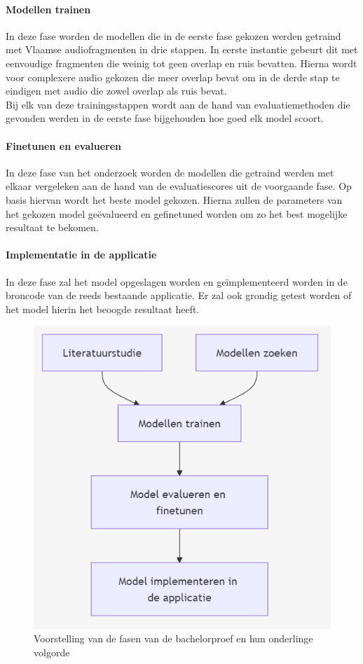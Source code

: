 \paragraph{Modellen trainen}
In deze fase worden de modellen die in de eerste fase gekozen werden getraind met Vlaamse audiofragmenten in drie stappen. In eerste instantie gebeurt dit met eenvoudige fragmenten die weinig tot geen overlap en ruis bevatten. Hierna wordt voor complexere audio gekozen die meer overlap bevat om in de derde stap te eindigen met audio die zowel overlap als ruis bevat.\\
Bij elk van deze trainingsstappen wordt aan de hand van evaluatiemethoden die gevonden werden in de eerste fase bijgehouden hoe goed elk model scoort.

\paragraph{Finetunen en evalueren}
In deze fase van het onderzoek worden de modellen die getraind werden met elkaar vergeleken aan de hand van de evaluatiescores uit de voorgaande fase. Op basis hiervan wordt het beste model gekozen. Hierna zullen de parameters van het gekozen model geëvalueerd en gefinetuned worden om zo het best mogelijke resultaat te bekomen.

\paragraph{Implementatie in de applicatie}
In deze fase zal het model opgeslagen worden en geïmplementeerd worden in de broncode van de reeds bestaande applicatie. Er zal ook grondig getest worden of het model hierin het beoogde resultaat heeft.

\begin{figure}
	\centering
	\includegraphics[scale=0.75]{./img/verloop.png}
	\caption{Voorstelling van de fasen van de bachelorproef en hun onderlinge volgorde}
\end{figure}